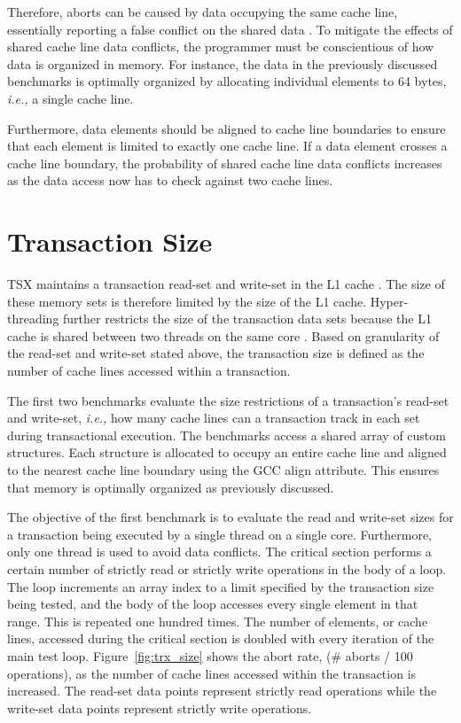 \documentclass[11pt]{book}
\begin{document}
\noindent
Therefore, aborts can be caused by data occupying the same cache line, essentially
reporting a false conflict on the shared data \cite{intel_opt_man}.  To mitigate the
effects of shared cache line data conflicts, the programmer must be conscientious of how
data is organized in memory.  For instance, the data in the previously discussed
benchmarks is optimally organized by allocating individual elements to 64 bytes,
\emph{i.e.,} a single cache line.

Furthermore, data elements should be aligned to cache line boundaries to ensure that each
element is limited to exactly one cache line.  If a data element crosses a cache line
boundary, the probability of shared cache line data conflicts increases as the data access
now has to check against two cache lines.

\section{Transaction Size}

TSX maintains a transaction read-set and write-set in the L1 cache \cite{intel_opt_man}.
The size of these memory sets is therefore limited by the size of the L1 cache.
Hyper-threading further restricts the size of the transaction data sets because the L1
cache is shared between two threads on the same core \cite{intel_opt_man}.  Based on
granularity of the read-set and write-set stated above, the transaction size is defined as
the number of cache lines accessed within a transaction.

The first two benchmarks evaluate the size restrictions of a transaction's read-set and
write-set, \emph{i.e.,} how many cache lines can a transaction track in each set during
transactional execution.  The benchmarks access a shared array of custom structures.  Each
structure is allocated to occupy an entire cache line and aligned to the nearest cache
line boundary using the GCC align attribute.  This ensures that memory is optimally
organized as previously discussed.

The objective of the first benchmark is to evaluate the read and write-set sizes for a
transaction being executed by a single thread on a single core.  Furthermore, only one
thread is used to avoid data conflicts.  The critical section performs a certain number of
strictly read or strictly write operations in the body of a loop.  The loop increments an
array index to a limit specified by the transaction size being tested, and the body of the
loop accesses every single element in that range.  This is repeated one hundred times.
The number of elements, or cache lines, accessed during the critical section is doubled
with every iteration of the main test loop.  Figure~\ref{fig:trx_size} shows the abort
rate, (\# aborts / 100 operations), as the number of cache lines accessed within the
transaction is increased.  The read-set data points represent strictly read operations
while the write-set data points represent strictly write operations.
\end{document}
